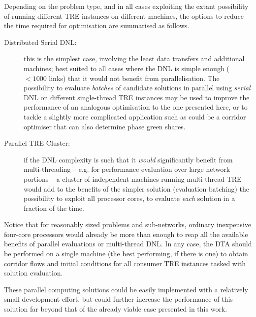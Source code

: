 Depending on the problem type, and in all cases exploiting the extant possibility of running different TRE instances on different machines, the options to reduce the time required for optimisation are summarised as follows.
\begin{description}
\item[Distributed Serial DNL:] this is the simplest case, involving the least data transfers and additional machines; best suited to all cases where the DNL is simple enough ($ < 1000$ links) that it would not benefit from parallelisation. The possibility to evaluate \emph{batches} of candidate solutions in parallel using \emph{serial} DNL on different single-thread TRE instances may be used to improve the performance of an analogous optimisation to the one presented here, or to tackle a slightly more complicated application such as could be a corridor optimiser that can also determine phase green shares.
\item[Parallel TRE Cluster:]  if the DNL complexity is such that it \emph{would} significantly benefit from multi-threading \--- e.g. for performance evaluation over large network portions \--- a cluster of independent machines running multi-thread TRE would add to the benefits of the simpler solution (evaluation batching) the possibility to exploit all processor cores, to evaluate \emph{each} solution in a fraction of the time.
\end{description}
Notice that for reasonably sized problems and sub-networks, ordinary inexpensive four-core processors would already be more than enough to reap all the available benefits of parallel evaluations or multi-thread DNL. In any case, the DTA should be performed on a single machine (the best performing, if there is one) to obtain corridor flows and initial conditions for all consumer TRE instances tasked with solution evaluation. 

These parallel computing solutions could be easily implemented with a relatively small development effort, but could further increase the performance of this solution far beyond that of the already viable case presented in this work.
